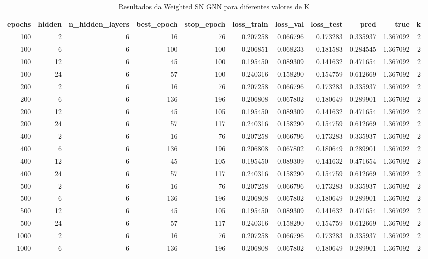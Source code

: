 \begin{table}
\caption{Resultados da Weighted SN GNN para diferentes valores de K}
\label{tab:weighted_gnn_results_all_k}
\begin{tabular}{rrrrrrrrrrr}
\toprule
epochs & hidden & n\_hidden\_layers & best\_epoch & stop\_epoch & loss\_train & loss\_val & loss\_test & pred & true & k \\
\midrule
100 & 2 & 6 & 16 & 76 & 0.207258 & 0.066796 & 0.173283 & 0.335937 & 1.367092 & 2 \\
100 & 6 & 6 & 100 & 100 & 0.206851 & 0.068233 & 0.181583 & 0.284545 & 1.367092 & 2 \\
100 & 12 & 6 & 45 & 100 & 0.195450 & 0.089309 & 0.141632 & 0.471654 & 1.367092 & 2 \\
100 & 24 & 6 & 57 & 100 & 0.240316 & 0.158290 & 0.154759 & 0.612669 & 1.367092 & 2 \\
200 & 2 & 6 & 16 & 76 & 0.207258 & 0.066796 & 0.173283 & 0.335937 & 1.367092 & 2 \\
200 & 6 & 6 & 136 & 196 & 0.206808 & 0.067802 & 0.180649 & 0.289901 & 1.367092 & 2 \\
200 & 12 & 6 & 45 & 105 & 0.195450 & 0.089309 & 0.141632 & 0.471654 & 1.367092 & 2 \\
200 & 24 & 6 & 57 & 117 & 0.240316 & 0.158290 & 0.154759 & 0.612669 & 1.367092 & 2 \\
400 & 2 & 6 & 16 & 76 & 0.207258 & 0.066796 & 0.173283 & 0.335937 & 1.367092 & 2 \\
400 & 6 & 6 & 136 & 196 & 0.206808 & 0.067802 & 0.180649 & 0.289901 & 1.367092 & 2 \\
400 & 12 & 6 & 45 & 105 & 0.195450 & 0.089309 & 0.141632 & 0.471654 & 1.367092 & 2 \\
400 & 24 & 6 & 57 & 117 & 0.240316 & 0.158290 & 0.154759 & 0.612669 & 1.367092 & 2 \\
500 & 2 & 6 & 16 & 76 & 0.207258 & 0.066796 & 0.173283 & 0.335937 & 1.367092 & 2 \\
500 & 6 & 6 & 136 & 196 & 0.206808 & 0.067802 & 0.180649 & 0.289901 & 1.367092 & 2 \\
500 & 12 & 6 & 45 & 105 & 0.195450 & 0.089309 & 0.141632 & 0.471654 & 1.367092 & 2 \\
500 & 24 & 6 & 57 & 117 & 0.240316 & 0.158290 & 0.154759 & 0.612669 & 1.367092 & 2 \\
1000 & 2 & 6 & 16 & 76 & 0.207258 & 0.066796 & 0.173283 & 0.335937 & 1.367092 & 2 \\
1000 & 6 & 6 & 136 & 196 & 0.206808 & 0.067802 & 0.180649 & 0.289901 & 1.367092 & 2 \\

\end{tabular}
\end{table}
